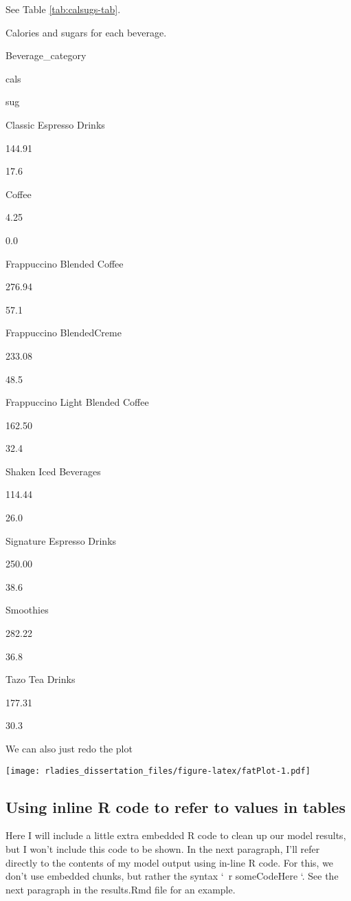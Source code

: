 \documentclass[
  12pt,
  oneside]{book}
\numberwithin{figure}{chapter}
\begin{document}
See Table \ref{tab:calsugs-tab}.

\label{tab:calsugs-tab}Calories and sugars for each beverage.

Beverage\_category

cals

sug

Classic Espresso Drinks

144.91

17.6

Coffee

4.25

0.0

Frappuccino Blended Coffee

276.94

57.1

Frappuccino BlendedCreme

233.08

48.5

Frappuccino Light Blended Coffee

162.50

32.4

Shaken Iced Beverages

114.44

26.0

Signature Espresso Drinks

250.00

38.6

Smoothies

282.22

36.8

Tazo Tea Drinks

177.31

30.3

We can also just redo the plot

\texttt{[image: rladies\_dissertation\_files/figure-latex/fatPlot-1.pdf]}

\hypertarget{using-inline-r-code-to-refer-to-values-in-tables}{%
\subsection{Using inline R code to refer to values in tables}\label{using-inline-r-code-to-refer-to-values-in-tables}}

Here I will include a little extra embedded R code to clean up our model results, but I won't include this code to be shown. In the next paragraph, I'll refer directly to the contents of my model output using in-line R code. For this, we don't use embedded chunks, but rather the syntax `~r someCodeHere `. See the next paragraph in the results.Rmd file for an example.
\end{document}
